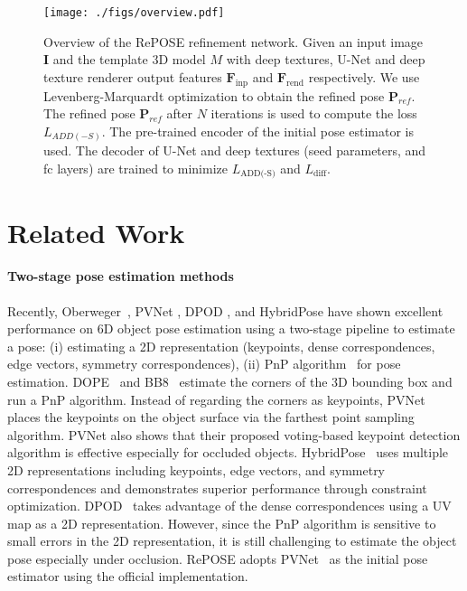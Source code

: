 \documentclass[10pt,twocolumn,letterpaper]{article}
\begin{document}
\vspace{0.5cm}
\begin{figure*}
\begin{center}
\texttt{[image: ./figs/overview.pdf]}
\end{center}
\caption{Overview of the RePOSE refinement network. Given an input image $\mathbf{I}$ and the template 3D model $M$ with deep textures, U-Net and deep texture renderer output features $\mathbf{F}_\text{inp}$ and $\mathbf{F}_\text{rend}$ respectively. We use Levenberg-Marquardt optimization \cite{10.1007/BFb0067700} to obtain the refined pose $\mathbf{P}_{ref}$. The refined pose $\mathbf{P}_{ref}$ after $N$ iterations is used to compute the loss $L_{ADD(-S)}$. The pre-trained encoder of the initial pose estimator is used. The decoder of U-Net and deep textures (seed parameters, and fc layers) are trained to minimize $L_\text{ADD(-S)}$ and $L_\text{diff}$.}
\label{fig:overview}
\end{figure*}


\section{Related Work}
\label{sec:related_work}
\paragraph{Two-stage pose estimation methods}

Recently, Oberweger~\cite{Oberweger_2018_ECCV}, PVNet \cite{peng2019pvnet}, DPOD \cite{Zakharov_2019_ICCV}, and HybridPose \cite{Song_2020_CVPR} have shown excellent performance on 6D object pose estimation using a two-stage pipeline to estimate a pose: (i) estimating a 2D representation (\eg keypoints, dense correspondences, edge vectors, symmetry correspondences), (ii) PnP algorithm~\cite{10.1007/s11263-008-0152-6,BPnP2020} for pose estimation. DOPE~\cite{tremblay2018corl:dope} and BB8~\cite{DBLP:journals/corr/RadL17} estimate the corners of the 3D bounding box and run a PnP algorithm. Instead of regarding the corners as keypoints, PVNet~\cite{peng2019pvnet} places the keypoints on the object surface via the farthest point sampling algorithm. PVNet also shows that their proposed voting-based keypoint detection algorithm is effective especially for occluded objects. HybridPose~\cite{Song_2020_CVPR} uses multiple 2D representations including keypoints, edge vectors, and symmetry correspondences and demonstrates superior performance through constraint optimization.
DPOD~\cite{Zakharov_2019_ICCV} takes advantage of the dense correspondences using a UV map as a 2D representation. However, since the PnP algorithm is sensitive to small errors in the 2D representation, it is still challenging to estimate the object pose especially under occlusion. RePOSE adopts PVNet~\cite{peng2019pvnet} as the initial pose estimator using the official implementation.
\end{document}
